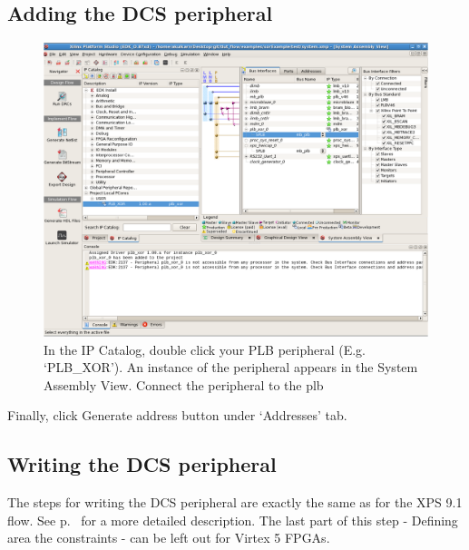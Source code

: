 \documentclass[a4paper,oneside]{memoir}
\begin{document}
\subsection{Adding the DCS peripheral}\label{sec:adding_peripheral_blaze}

\begin{figure}[H]
\centering
\includegraphics[scale=0.5]{step23}
\caption{In the IP Catalog, double click your PLB peripheral (E.g. `PLB\_XOR'). An instance of the peripheral appears in the System Assembly View. Connect the peripheral to the plb\label{fig:step23}}
\end{figure}

Finally, click Generate address button under `Addresses' tab.



\subsection{Writing the DCS peripheral}\label{sec:writing_peripheral_blaze}

The steps for writing the DCS peripheral are exactly the same as for the XPS 9.1 flow. See p.\ \pageref{sec:writing_peripheral} for a more detailed description.
The last part of this step - Defining area the constraints - can be left out for Virtex 5 FPGAs.
\end{document}
